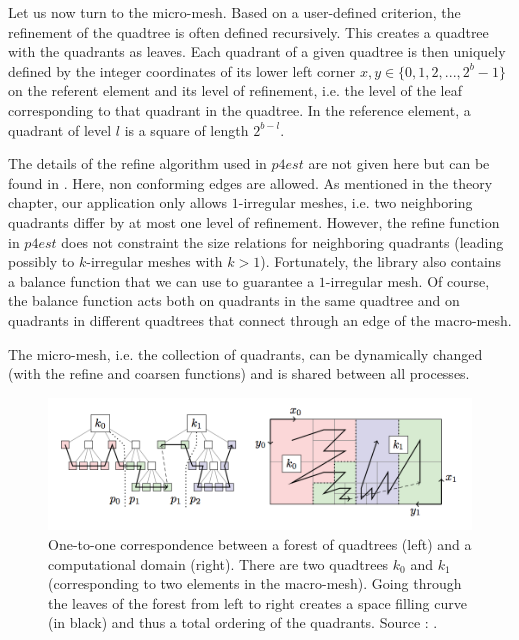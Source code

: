 Let us now turn to the micro-mesh. Based on a user-defined criterion, the refinement of the quadtree is often defined recursively. This creates a quadtree with the quadrants as leaves. Each quadrant of a given quadtree is then uniquely defined by the integer coordinates of its lower left corner $x,y \in \{0,1,2,...,2^b-1\}$ on the referent element and its level of refinement, i.e. the level of the leaf corresponding to that quadrant in the quadtree. In the reference element, a quadrant of level $l$ is a square of length $2^{b-l}$.


The details of the refine algorithm used in $p4est$ are not given here but can be found in \cite{p4est}. Here, non conforming edges are allowed. As mentioned in the theory chapter, our application only allows $1$-irregular meshes, i.e. two neighboring quadrants differ by at most one level of refinement. However, the refine function in $p4est$ does not constraint the size relations for neighboring quadrants (leading possibly to $k$-irregular meshes with $k>1$). Fortunately, the library also contains a balance function that we can use to guarantee a $1$-irregular mesh. Of course, the balance function acts both on quadrants in the same quadtree and on quadrants in different quadtrees that connect through an edge of the macro-mesh. 

The micro-mesh, i.e. the collection of quadrants, can be dynamically changed (with the refine and coarsen functions) and is shared between all processes. 

\begin{figure}
\centering
\includegraphics[scale=1.0]{Implementation/filling_curve.png}
\caption{One-to-one correspondence between a forest of quadtrees (left) and a computational domain (right). There are two quadtrees $k_0$ and $k_1$ (corresponding to two elements in the macro-mesh). Going through the leaves of the forest from left to right creates a space filling curve (in black) and thus a total ordering of the quadrants. Source : \cite{p4est}. }
\label{filling_curve}
\end{figure}

